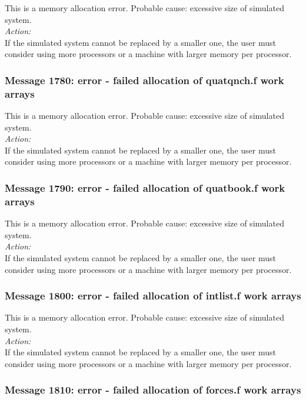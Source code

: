 This is a memory allocation error. Probable cause: excessive size of
simulated system. \\

\noindent
{\em Action:}\\
If the simulated system cannot be replaced by a smaller one, the user
must consider using more processors or a machine with larger memory
per processor.

\subsubsection*{Message 1780: error - failed allocation of quatqnch.f
work arrays}

This is a memory allocation error. Probable cause: excessive size of
simulated system. \\

\noindent
{\em Action:}\\
If the simulated system cannot be replaced by a smaller one, the user
must consider using more processors or a machine with larger memory
per processor.

\subsubsection*{Message 1790: error - failed allocation of quatbook.f
work arrays}

This is a memory allocation error. Probable cause: excessive size of
simulated system. \\

\noindent
{\em Action:}\\
If the simulated system cannot be replaced by a smaller one, the user
must consider using more processors or a machine with larger memory
per processor.

\subsubsection*{Message 1800: error - failed allocation of intlist.f
work arrays}

This is a memory allocation error. Probable cause: excessive size of
simulated system. \\

\noindent
{\em Action:}\\
If the simulated system cannot be replaced by a smaller one, the user
must consider using more processors or a machine with larger memory
per processor.

\subsubsection*{Message 1810: error - failed allocation of forces.f
work arrays}

